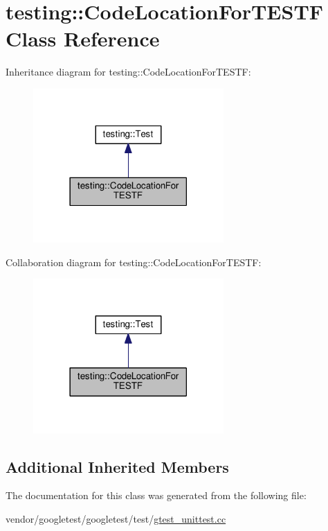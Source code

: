 \hypertarget{classtesting_1_1CodeLocationForTESTF}{}\section{testing\+:\+:Code\+Location\+For\+T\+E\+S\+TF Class Reference}
\label{classtesting_1_1CodeLocationForTESTF}


Inheritance diagram for testing\+:\+:Code\+Location\+For\+T\+E\+S\+TF\+:
\nopagebreak
\begin{figure}[H]
\begin{center}
\leavevmode
\includegraphics[width=206pt]{classtesting_1_1CodeLocationForTESTF__inherit__graph}
\end{center}
\end{figure}


Collaboration diagram for testing\+:\+:Code\+Location\+For\+T\+E\+S\+TF\+:
\nopagebreak
\begin{figure}[H]
\begin{center}
\leavevmode
\includegraphics[width=206pt]{classtesting_1_1CodeLocationForTESTF__coll__graph}
\end{center}
\end{figure}
\subsection*{Additional Inherited Members}


The documentation for this class was generated from the following file\+:\begin{DoxyCompactItemize}
\item 
vendor/googletest/googletest/test/\hyperlink{gtest__unittest_8cc}{gtest\+\_\+unittest.\+cc}\end{DoxyCompactItemize}
